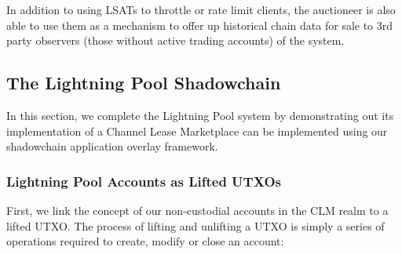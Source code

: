 \documentclass[10pt,a4paper]{article}
\theoremstyle{definition}
\begin{document}
In addition to using LSATs to throttle or rate limit clients, the auctioneer is
also able to use them as a mechanism to offer up historical chain data for sale
to 3rd party observers (those without active trading accounts) of the system.



\subsection{The Lightning Pool Shadowchain}

In this section, we complete the Lightning Pool system by demonstrating out its
implementation of a Channel Lease Marketplace can be implemented using our
shadowchain application overlay framework.


\subsubsection{Lightning Pool Accounts as Lifted UTXOs}

First, we link the concept of our non-custodial accounts in the CLM realm to a
lifted UTXO. The process of lifting and unlifting a UTXO is simply a series of
operations required to create, modify or close an account:

\begin{pcvstack}[boxed,center, space=1em]


\end{pcvstack}
\end{document}
